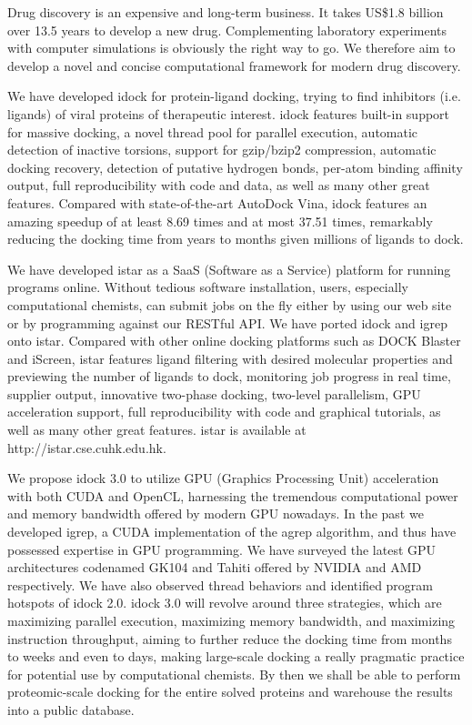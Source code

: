Drug discovery is an expensive and long-term business. It takes US\$1.8 billion over 13.5 years to develop a new drug. Complementing laboratory experiments with computer simulations is obviously the right way to go. We therefore aim to develop a novel and concise computational framework for modern drug discovery.

We have developed idock for protein-ligand docking, trying to find inhibitors (i.e. ligands) of viral proteins of therapeutic interest. idock features built-in support for massive docking, a novel thread pool for parallel execution, automatic detection of inactive torsions, support for gzip/bzip2 compression, automatic docking recovery, detection of putative hydrogen bonds, per-atom binding affinity output, full reproducibility with code and data, as well as many other great features. Compared with state-of-the-art AutoDock Vina, idock features an amazing speedup of at least 8.69 times and at most 37.51 times, remarkably reducing the docking time from years to months given millions of ligands to dock.

We have developed istar as a SaaS (Software as a Service) platform for running programs online. Without tedious software installation, users, especially computational chemists, can submit jobs on the fly either by using our web site or by programming against our RESTful API. We have ported idock and igrep onto istar. Compared with other online docking platforms such as DOCK Blaster and iScreen, istar features ligand filtering with desired molecular properties and previewing the number of ligands to dock, monitoring job progress in real time, supplier output, innovative two-phase docking, two-level parallelism, GPU acceleration support, full reproducibility with code and graphical tutorials, as well as many other great features. istar is available at http://istar.cse.cuhk.edu.hk.

We propose idock 3.0 to utilize GPU (Graphics Processing Unit) acceleration with both CUDA and OpenCL, harnessing the tremendous computational power and memory bandwidth offered by modern GPU nowadays. In the past we developed igrep, a CUDA implementation of the agrep algorithm, and thus have possessed expertise in GPU programming. We have surveyed the latest GPU architectures codenamed GK104 and Tahiti offered by NVIDIA and AMD respectively. We have also observed thread behaviors and identified program hotspots of idock 2.0. idock 3.0 will revolve around three strategies, which are maximizing parallel execution, maximizing memory bandwidth, and maximizing instruction throughput, aiming to further reduce the docking time from months to weeks and even to days, making large-scale docking a really pragmatic practice for potential use by computational chemists. By then we shall be able to perform proteomic-scale docking for the entire solved proteins and warehouse the results into a public database.

